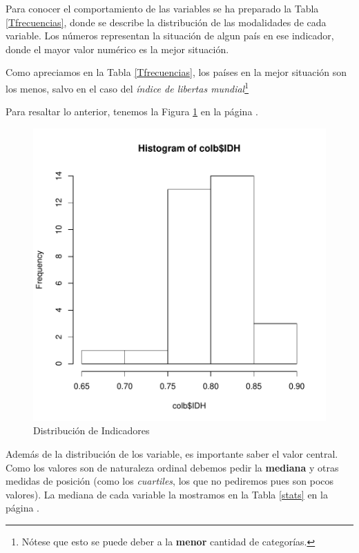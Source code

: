 \documentclass{article}
\begin{document}
Para conocer el comportamiento de las variables se ha preparado la Tabla \ref{Tfrecuencias}, donde se describe la distribuci\'on de las modalidades de cada variable. Los n\'umeros representan la situaci\'on de algun pa\'is en ese indicador, donde el mayor valor num\'erico es la mejor situaci\'on.


Como apreciamos en la Tabla \ref{Tfrecuencias}, los pa\'ises en la mejor situaci\'on son los menos, salvo en el caso del \emph{\'indice de libertas mundial}\footnote{N\'otese que esto se puede deber a la {\bf menor} cantidad de categor\'ias.}

\clearpage

Para resaltar lo anterior, tenemos la Figura \ref{barplots} en la p\'agina \pageref{barplots}. 


\begin{figure}[h]
\centering

\includegraphics{FinaldeR-barplots}

\caption{Distribuci\'on de Indicadores}
\label{barplots}
\end{figure}

Adem\'as de la distribuci\'on de los variable, es importante saber el valor central. Como los valores son de naturaleza ordinal debemos pedir la {\bf mediana} y otras medidas de posici\'on (como los \emph{cuartiles}, los que no pediremos pues son pocos valores). La mediana de cada variable la mostramos en la Tabla \ref{stats} en la p\'agina \pageref{stats}.
\end{document}
